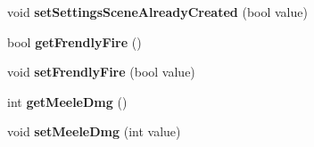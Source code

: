 \begin{DoxyCompactItemize}
\item 
void {\bfseries set\+Settings\+Scene\+Already\+Created} (bool value)\hypertarget{class_game_settings_a0233a269b097dd39fd64de7ea6b4f7e4}{}\label{class_game_settings_a0233a269b097dd39fd64de7ea6b4f7e4}

\item 
bool {\bfseries get\+Frendly\+Fire} ()\hypertarget{class_game_settings_a9523032148fc49867ef22e1f40820913}{}\label{class_game_settings_a9523032148fc49867ef22e1f40820913}

\item 
void {\bfseries set\+Frendly\+Fire} (bool value)\hypertarget{class_game_settings_a8320f6737eeb98b8d22e8f546e6e846d}{}\label{class_game_settings_a8320f6737eeb98b8d22e8f546e6e846d}

\item 
int {\bfseries get\+Meele\+Dmg} ()\hypertarget{class_game_settings_a555c22aa9451428bcea885869d4c3a95}{}\label{class_game_settings_a555c22aa9451428bcea885869d4c3a95}

\item 
void {\bfseries set\+Meele\+Dmg} (int value)\hypertarget{class_game_settings_af88bb64a3cf2b3e79e161ad278d4b6dd}{}\label{class_game_settings_af88bb64a3cf2b3e79e161ad278d4b6dd}

\end{DoxyCompactItemize}
